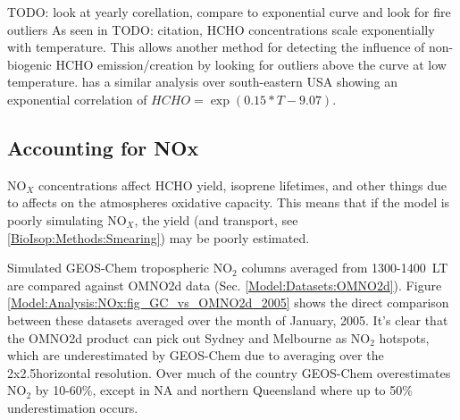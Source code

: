     TODO: look at yearly corellation, compare to exponential curve and look for fire outliers
    As seen in TODO: citation, HCHO concentrations scale exponentially with temperature.
    This allows another method for detecting the influence of non-biogenic HCHO emission/creation by looking for outliers above the curve at low temperature.
    \cite{Zhu2013_poster} has a similar analysis over south-eastern USA showing an exponential correlation of ${HCHO} = \exp(0.15*{T}−9.07)$.
    
    \subsection{Accounting for NOx}
    \label{Model:Analysis:NOx}
    
    NO$_X$ concentrations affect HCHO yield, isoprene lifetimes, and other things due to affects on the atmospheres oxidative capacity.
    This means that if the model is poorly simulating NO$_X$, the yield (and transport, see \ref{BioIsop:Methods:Smearing}) may be poorly estimated.
    
    Simulated GEOS-Chem tropospheric NO$_2$ columns averaged from 1300-1400~LT are compared against OMNO2d data (Sec. \ref{Model:Datasets:OMNO2d}). 
    Figure \ref{Model:Analysis:NOx:fig_GC_vs_OMNO2d_2005} shows the direct comparison between these datasets averaged over the month of January, 2005.
    It's clear that the OMNO2d product can pick out Sydney and Melbourne as NO$_2$ hotspots, which are underestimated by GEOS-Chem due to averaging over the 2x2.5\degr horizontal resolution.
    Over much of the country GEOS-Chem overestimates NO$_2$ by 10-60\%, except in NA and northern Queensland where up to 50\% underestimation occurs.
    

